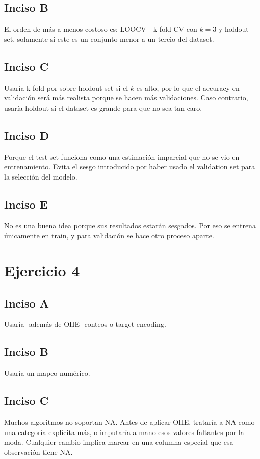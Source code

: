 \documentclass[12pt, a4paper]{article}
\begin{document}
\subsection*{Inciso B}
\noindent El orden de más a menos costoso es: LOOCV - k-fold CV con $k = 3$ y holdout set, solamente si este es un conjunto menor a un tercio del dataset.

\subsection*{Inciso C}
\noindent Usaría k-fold por sobre holdout set si el $k$ es alto, por lo que el accuracy en validación será más realista porque se hacen más validaciones. Caso contrario, usaría holdout si el dataset es grande para que no sea tan caro.

\subsection*{Inciso D}
\noindent Porque el test set funciona como una estimación imparcial que no se vio en entrenamiento. Evita el sesgo introducido por haber usado el validation set para la selección del modelo.

\subsection*{Inciso E}
\noindent No es una buena idea porque sus resultados estarán sesgados. Por eso se entrena únicamente en train, y para validación se hace otro proceso aparte.

\section*{Ejercicio 4}
\subsection*{Inciso A}
\noindent Usaría -además de OHE- conteos o target encoding.

\subsection*{Inciso B}
\noindent Usaría un mapeo numérico.

\subsection*{Inciso C}
\noindent Muchos algoritmos no soportan NA. Antes de aplicar OHE, trataría a NA como una categoría explícita más, o imputaría a mano esos valores faltantes por la moda. Cualquier cambio implica marcar en una columna especial que esa observación tiene NA.
\end{document}
